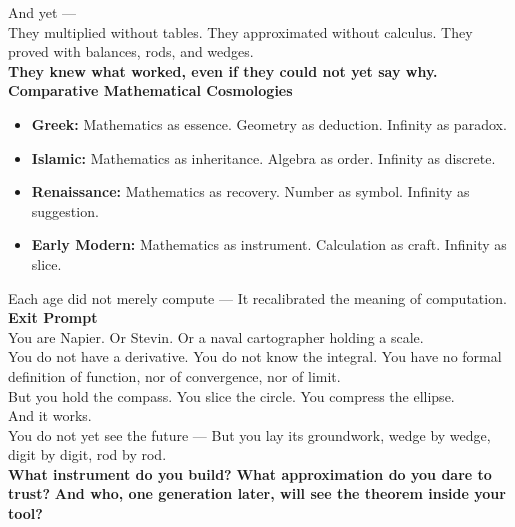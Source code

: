 \documentclass[9pt]{article}
\begin{document}
And yet —\\

They multiplied without tables.  
They approximated without calculus.  
They proved with balances, rods, and wedges.\\

\textbf{They knew what worked, even if they could not yet say why.}\\

\textbf{Comparative Mathematical Cosmologies}\\

\begin{itemize}
    \item \textbf{Greek:} Mathematics as essence. Geometry as deduction. Infinity as paradox.
    \item \textbf{Islamic:} Mathematics as inheritance. Algebra as order. Infinity as discrete.
    \item \textbf{Renaissance:} Mathematics as recovery. Number as symbol. Infinity as suggestion.
    \item \textbf{Early Modern:} Mathematics as instrument. Calculation as craft. Infinity as slice.
\end{itemize}

Each age did not merely compute —  
It recalibrated the meaning of computation.\\

\textbf{Exit Prompt}\\

You are Napier. Or Stevin. Or a naval cartographer holding a scale.\\

You do not have a derivative.  
You do not know the integral.  
You have no formal definition of function, nor of convergence, nor of limit.\\

But you hold the compass.  
You slice the circle.  
You compress the ellipse.\\

And it works.\\

You do not yet see the future —  
But you lay its groundwork, wedge by wedge, digit by digit, rod by rod.\\

\textbf{What instrument do you build?}  
\textbf{What approximation do you dare to trust?}  
\textbf{And who, one generation later, will see the theorem inside your tool?}
\end{document}
